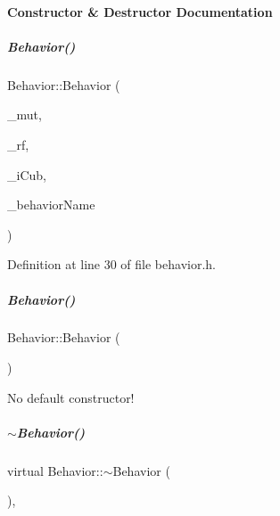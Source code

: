 \paragraph{Constructor \& Destructor Documentation}
\mbox{\label{group__behaviorManager_acd73bfebbe60da8cb7ef41cbde780bec}} 
\subparagraph{\texorpdfstring{Behavior()}{Behavior()}\hspace{0.1cm}{\footnotesize\ttfamily [1/2]}}
{\footnotesize\ttfamily Behavior\+::\+Behavior (\begin{DoxyParamCaption}\item[{yarp\+::os\+::\+Mutex $\ast$}]{\+\_\+mut,  }\item[{yarp\+::os\+::\+Resource\+Finder \&}]{\+\_\+rf,  }\item[{\hyperlink{group__icubclient__clients_classicubclient_1_1ICubClient}{icubclient\+::\+I\+Cub\+Client} $\ast$}]{\+\_\+i\+Cub,  }\item[{std\+::string}]{\+\_\+behavior\+Name }\end{DoxyParamCaption})\hspace{0.3cm}{\ttfamily [inline]}}



Definition at line 30 of file behavior.\+h.

\mbox{\label{group__behaviorManager_aab6b9945e55735c64af699fef74b23cf}} 
\subparagraph{\texorpdfstring{Behavior()}{Behavior()}\hspace{0.1cm}{\footnotesize\ttfamily [2/2]}}
{\footnotesize\ttfamily Behavior\+::\+Behavior (\begin{DoxyParamCaption}{ }\end{DoxyParamCaption})\hspace{0.3cm}{\ttfamily [delete]}}



No default constructor! 

\mbox{\label{group__behaviorManager_aff31e5c76f8837460f90403381a4a94e}} 
\subparagraph{\texorpdfstring{$\sim$\+Behavior()}{~Behavior()}}
{\footnotesize\ttfamily virtual Behavior\+::$\sim$\+Behavior (\begin{DoxyParamCaption}{ }\end{DoxyParamCaption})\hspace{0.3cm}{\ttfamily [inline]}, {\ttfamily [virtual]}}




